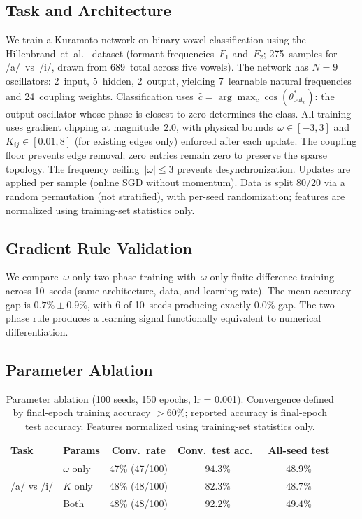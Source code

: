 \documentclass[11pt,a4paper]{article}
\begin{document}
\subsection{Task and Architecture}

We train a Kuramoto network on binary vowel classification using the
Hillenbrand~et~al.~\citeyearpar{hillenbrand1995acoustic} dataset (formant
frequencies~$F_1$ and~$F_2$; 275~samples for /a/~vs~/i/, drawn from
689~total across five vowels). The network has $N = 9$
oscillators: 2~input, 5~hidden, 2~output, yielding 7~learnable natural
frequencies and 24~coupling weights.
Classification uses~$\hat{c} = \arg\max_c \cos(\theta^*_{\text{out}_c})$:
the output oscillator whose phase is closest to zero determines the class.
All training uses gradient clipping at magnitude~$2.0$, with physical
bounds~$\omega \in [-3, 3]$ and~$K_{ij} \in [0.01, 8]$ (for existing
edges only) enforced after each update. The coupling floor prevents edge
removal; zero entries remain zero to preserve the sparse topology. The
frequency ceiling~$|\omega| \leq 3$ prevents desynchronization.
Updates are applied per sample (online SGD without momentum).
Data is split 80/20 via a random permutation (not stratified), with
per-seed randomization; features are normalized using training-set
statistics only.

\subsection{Gradient Rule Validation}

We compare~$\omega$-only two-phase training with~$\omega$-only
finite-difference training across 10~seeds (same architecture, data, and
learning rate). The mean accuracy gap is $0.7\% \pm 0.9\%$, with 6 of
10~seeds producing exactly 0.0\% gap. The two-phase rule produces a
learning signal functionally equivalent to numerical differentiation.

\subsection{Parameter Ablation}
\label{sec:ablation}

\begin{table}[t]
  \centering
  \caption{%
    Parameter ablation (100 seeds, 150 epochs, lr = 0.001).
    Convergence defined by final-epoch training accuracy $> 60\%$;
    reported accuracy is final-epoch test accuracy.
    Features normalized using training-set statistics only.
  }
  \label{tab:ablation}
  \begin{tabular}{@{}llccc@{}}
    \toprule
    Task & Params & Conv.\ rate & Conv.\ test acc.\ & All-seed test \\
    \midrule
    \multirow{3}{*}{/a/ vs /i/}
    & $\omega$ only & 47\% (47/100) & $94.3\%$ & $48.9\%$ \\
    & $K$ only      & 48\% (48/100) & $82.3\%$ & $48.7\%$ \\
    & Both          & 48\% (48/100) & $92.2\%$ & $49.4\%$ \\
    \bottomrule
  \end{tabular}
\end{table}
\end{document}
